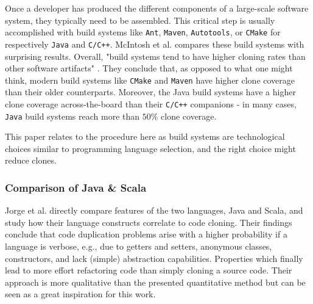 Once a developer has produced the different components of a large-scale software system, they typically need to be assembled. This critical step is usually accomplished with build systems like \texttt{Ant},  \texttt{Maven}, \texttt{Autotools}, or \texttt{CMake} for respectively \texttt{Java} and \texttt{C/C++}. McIntosh et al. \cite{mcintosh2014collecting} compares these build systems with surprising results. Overall, "build systems tend to have higher cloning rates than other software artifacts" \cite{mcintosh2014collecting}. They conclude that, as opposed to what one might think, modern build systems like \texttt{CMake} and  \texttt{Maven} have higher clone coverage than their older counterparts. Moreover, the Java build systems have a higher clone coverage across-the-board than their \texttt{C/C++} companions - in many cases, \texttt{Java} build systems reach more than $50\%$ clone coverage.

This paper relates to the procedure here as build systems are technological choices similar to programming language selection, and the right choice might reduce clones.

\subsubsection{Comparison of Java \& Scala}

Jorge et al. \cite{jorge2012impact} directly compare features of the two languages, Java and Scala, and study how their language constructs correlate to code cloning. Their findings conclude that code duplication problems arise with a higher probability if a language is verbose, e.g., due to getters and setters, anonymous classes, constructors, and lack (simple) abstraction capabilities. Properties which finally lead to more effort refactoring code than simply cloning a source code. \cite{jorge2012impact}
Their approach is more qualitative than the presented quantitative method but can be seen as a great inspiration for this work.
